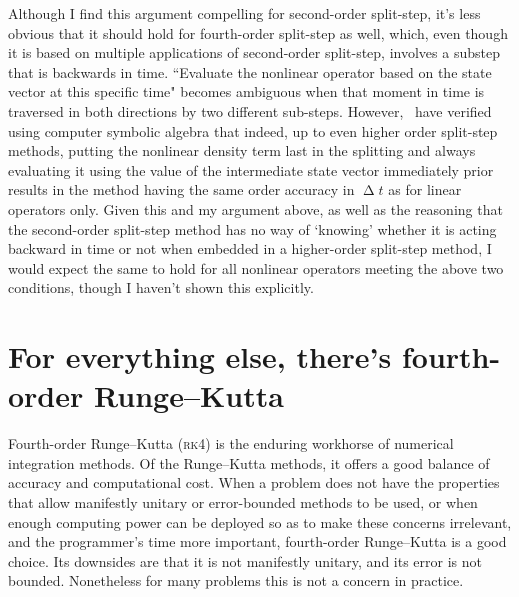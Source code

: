 Although I find this argument compelling for second-order split-step, it's less obvious that it should hold for fourth-order split-step as well, which, even though it is based on multiple applications of second-order split-step, involves a substep that is backwards in time. ``Evaluate the nonlinear operator based on the state vector at this specific time" becomes ambiguous when that moment in time is traversed in both directions by two different sub-steps. However,~\cite{javanainen_symbolic_2006} have verified using computer symbolic algebra that indeed, up to even higher order split-step methods, putting the nonlinear density term last in the splitting and always evaluating it using the value of the intermediate state vector immediately prior results in the method having the same order accuracy in $\upDelta t$ as for linear operators only. Given this and my argument above, as well as the reasoning that the second-order split-step method has no way of `knowing' whether it is acting backward in time or not when embedded in a higher-order split-step method, I would expect the same to hold for all nonlinear operators meeting the above two conditions, though I haven't shown this explicitly.

\section{For everything else, there's fourth-order Runge--Kutta}\label{sec:rk4}

Fourth-order Runge--Kutta (\textsc{rk4}) is the enduring workhorse of numerical integration methods. Of the Runge--Kutta methods, it offers a good balance of accuracy and computational cost. When a problem does not have the properties that allow manifestly unitary or error-bounded methods to be used, or when enough computing power can be deployed so as to make these concerns irrelevant, and the programmer's time more important, fourth-order Runge--Kutta is a good choice. Its downsides are that it is not manifestly unitary, and its error is not bounded. Nonetheless for many problems this is not a concern in practice.

